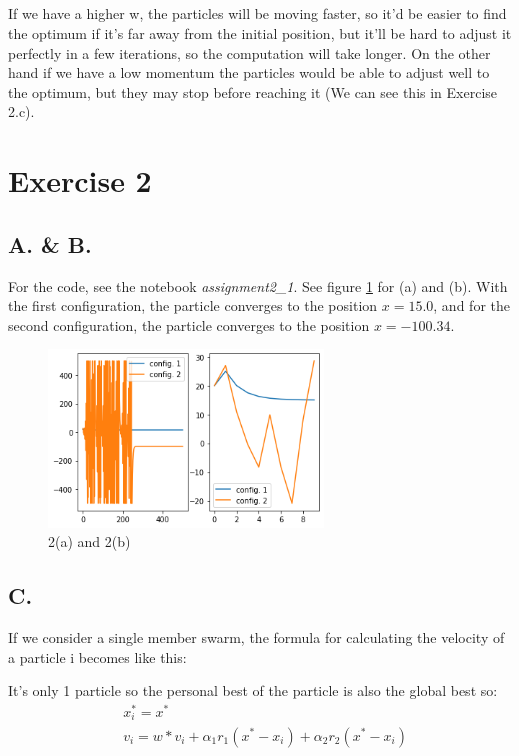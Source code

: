 \documentclass{scrartcl}
\begin{document}
\subsection{}
If we have a higher w, the particles will be moving faster, so it'd be easier to find the optimum if it's far away from the initial position, but it'll be hard to adjust it perfectly in a few iterations, so the computation will take longer.
On the other hand if we have a low momentum the particles would be able to adjust well to the optimum, but they may stop before reaching it (We can see this in Exercise 2.c).

\section{Exercise 2}
\subsection*{A. \& B.}
For the code, see the notebook \emph{assignment2\_1}.
See figure \ref{fig:2_1} for (a) and (b). With the first configuration,
the particle converges to the position $x = 15.0$, and for the second
configuration, the particle converges to the position $x = -100.34$.

\begin{figure}
  \centering
  \includegraphics[width=0.65\textwidth]{images/2.png}
  \caption{2(a) and 2(b)}
  \label{fig:2_1}
\end{figure}

\subsection*{C.}
If we consider a single member swarm, the formula for calculating the
velocity of a particle i becomes like this:

It's only 1 particle so the personal best of the particle is also the
global best so:
\begin{align}
  & x_{i}^{*} = x^* \\
  & v_i = w*v_i + \alpha _1 r_1 (x^{*} - x_i) + \alpha _2 r_2 (x^{*} - x_i)
\end{align}
\end{document}
